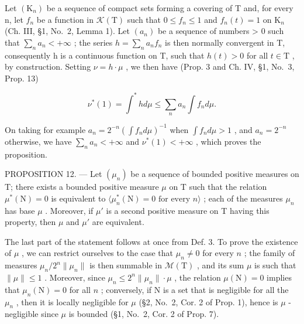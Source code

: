 Let \((\mathrm{K}_{n})\) be a sequence of compact sets forming a covering of T and, for every n, let \(f_{n}\) be a function in \(\mathcal{K}(\mathrm{T})\) such that \(0 \leqslant f_{n} \leqslant 1\) and \(f_{n}(t) = 1\) on \(\mathrm{K}_{n}\) (Ch. III, §1, No.~2, Lemma 1). Let \((a_{n})\) be a sequence of numbers \textgreater{} 0 such that \(\sum_{n} a_{n} < +\infty\) ; the series \(h = \sum_{n} a_{n} f_{n}\) is then normally convergent in T, consequently h is a continuous function on T, such that \(h(t) > 0\) for all \(t \in \mathrm{T}\) , by construction. Setting \(\nu = h \cdot \mu\) , we then have (Prop. 3 and Ch. IV, §1, No.~3, Prop. 13)

\[
\nu^ {*} (1) = \int^ {*} h d \mu \leqslant \sum_ {n} a _ {n} \int f _ {n} d \mu .
\]

On taking for example \(a_{n} = 2^{-n}\left(\int f_{n}d\mu\right)^{-1}\) when \(\int f_n d\mu > 1\) , and \(a_{n} = 2^{-n}\) otherwise, we have \(\sum_{n}a_{n} < +\infty\) and \(\nu^{*}(1) < +\infty\) , which proves the proposition.

PROPOSITION 12. --- Let \((\mu_n)\) be a sequence of bounded positive measures on T; there exists a bounded positive measure \(\mu\) on T such that the relation \(\mu^*(\mathrm{N}) = 0\) is equivalent to \(\langle \mu_n^*(\mathrm{N}) = 0 \text{ for every } n \rangle\) ; each of the measures \(\mu_n\) has base \(\mu\) . Moreover, if \(\mu'\) is a second positive measure on T having this property, then \(\mu\) and \(\mu'\) are equivalent.

The last part of the statement follows at once from Def. 3. To prove the existence of \(\mu\) , we can restrict ourselves to the case that \(\mu_n \neq 0\) for every \(n\) ; the family of measures \(\mu_n / 2^n \| \mu_n \|\) is then summable in \(\mathcal{M}(\mathrm{T})\) , and its sum \(\mu\) is such that \(\| \mu \| \leqslant 1\) . Moreover, since \(\mu_n \leqslant 2^n \| \mu_n \| \cdot \mu\) , the relation \(\mu(\mathrm{N}) = 0\) implies that \(\mu_n(\mathrm{N}) = 0\) for all \(n\) ; conversely, if \(\mathrm{N}\) is a set that is negligible for all the \(\mu_n\) , then it is locally negligible for \(\mu\) (§2, No.~2, Cor. 2 of Prop. 1), hence is \(\mu\) -negligible since \(\mu\) is bounded (§1, No.~2, Cor. 2 of Prop. 7).

